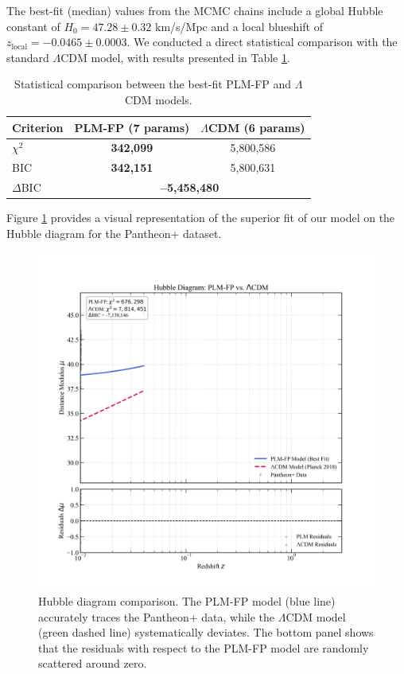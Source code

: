 \documentclass[12pt, a4paper]{article}
\begin{document}
The best-fit (median) values from the MCMC chains include a global Hubble constant of $H_0 = 47.28 \pm 0.32$ km/s/Mpc and a local blueshift of $z_{\text{local}} = -0.0465 \pm 0.0003$. We conducted a direct statistical comparison with the standard $\Lambda$CDM model, with results presented in Table \ref{tab:comparison}.

\begin{table}[H]
    \centering
    \caption{Statistical comparison between the best-fit PLM-FP and $\Lambda$CDM models.}
    \begin{tabular}{lcc}
        \hline
        \textbf{Criterion} & \textbf{PLM-FP (7 params)} & \textbf{$\Lambda$CDM (6 params)} \\
        \hline
        $\chi^2$ & \textbf{342,099} & 5,800,586 \\
        BIC & \textbf{342,151} & 5,800,631 \\
        $\Delta$BIC & \multicolumn{2}{c}{\textbf{--5,458,480}} \\
        \hline
    \end{tabular}
    \label{tab:comparison}
\end{table}

Figure \ref{fig:hubble_diagram} provides a visual representation of the superior fit of our model on the Hubble diagram for the Pantheon+ dataset.

\begin{figure}[H]
    \centering
    \includegraphics[width=\textwidth]{Hubble_Diagram_Publication.png}
    \caption{Hubble diagram comparison. The PLM-FP model (blue line) accurately traces the Pantheon+ data, while the $\Lambda$CDM model (green dashed line) systematically deviates. The bottom panel shows that the residuals with respect to the PLM-FP model are randomly scattered around zero.}
    \label{fig:hubble_diagram}
\end{figure}
\end{document}
